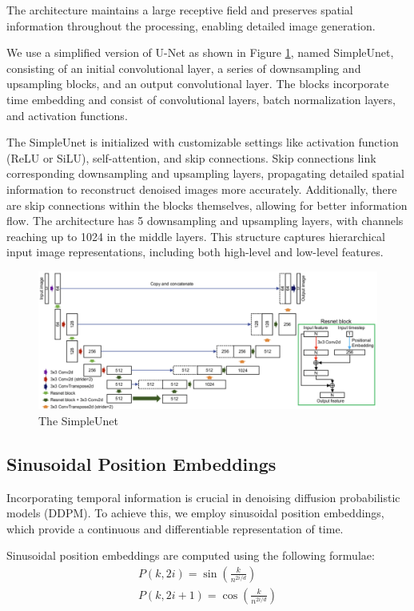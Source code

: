 \documentclass[letterpaper]{article} %
\begin{document}
The architecture maintains a large receptive field and preserves spatial information throughout the processing, enabling detailed image generation.  

We use a simplified version of U-Net as shown in Figure \ref{fig:figure3}, named SimpleUnet, consisting of an initial convolutional layer, a series of downsampling and upsampling blocks, and an output convolutional layer. The blocks incorporate time embedding and consist of convolutional layers, batch normalization layers, and activation functions.

The SimpleUnet is initialized with customizable settings like activation function (ReLU or SiLU), self-attention, and skip connections.
Skip connections link corresponding downsampling and upsampling layers, propagating detailed spatial information to reconstruct denoised images more accurately. Additionally, there are skip connections within the blocks themselves, allowing for better information flow. The architecture has 5 downsampling and upsampling layers, with channels reaching up to 1024 in the middle layers. This structure captures hierarchical input image representations, including both high-level and low-level features.

\begin{figure}[htbp]
    \centering
    \includegraphics[width=1.1\linewidth]{f3.png} %
    \caption{The SimpleUnet}
    \label{fig:figure3}
\end{figure}

\subsection{Sinusoidal Position Embeddings}
Incorporating temporal information is crucial in denoising diffusion probabilistic models (DDPM). To achieve this, we employ sinusoidal position embeddings, which provide a continuous and differentiable representation of time.

Sinusoidal position embeddings are computed using the following formulae:
\begin{equation}
\begin{aligned}
P(k, 2 i)=\sin \left(\frac{k}{n^{2 i / d}}\right) \\
P(k, 2 i+1)=\cos \left(\frac{k}{n^{2 i / d}}\right)
\end{aligned}
\end{equation}
\end{document}
